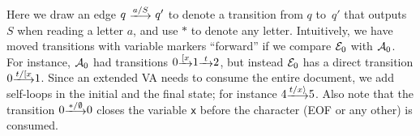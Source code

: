 \begin{example}
\begin{center}
\end{center}
Here we draw an edge $q \ \longtrans{a / S} \ q'$ to denote a transition from
$q$ to~$q'$ that outputs $S$ when reading a letter $a$, and use $*$ to denote
any letter. Intuitively, we have moved transitions with variable markers
``forward'' if we compare $\mathcal{E}_0$ with $\mathcal{A}_0$.  For instance, $\mathcal{A}_0$ had
transitions $0 \trans{\Open{x}} 1 \trans{t} 2$, but instead $\mathcal{E}_0$ has a direct
transition $0 \longtrans{t/\Open{x}} 1$.  Since an extended VA needs to consume
the entire document, we add self-loops in the initial and the final state; for
instance $4 \longtrans{t/\Close{x}} 5$. Also note that the transition $0
\longtrans{*/\emptyset} 0$ closes the variable \texttt{x} before the character
(\textsf{EOF} or any other) is consumed.
\end{example}

